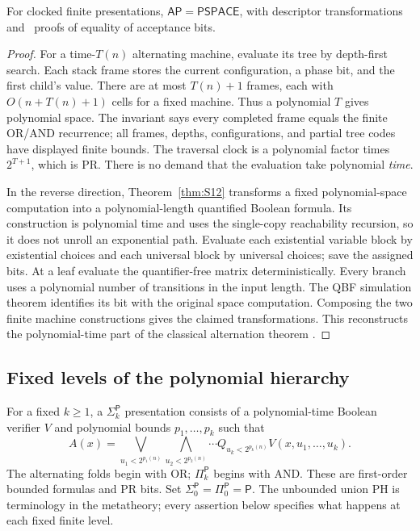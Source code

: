 \begin{theorem}\label{thm:A01}
For clocked finite presentations, $\mathsf{AP}=\mathsf{PSPACE}$, with descriptor transformations and \ipra\ proofs of equality of acceptance bits.
\end{theorem}
\begin{proof}
For a time-$T(n)$ alternating machine, evaluate its tree by depth-first search. Each stack frame stores the current configuration, a phase bit, and the first child's value. There are at most $T(n)+1$ frames, each with $O(n+T(n)+1)$ cells for a fixed machine. Thus a polynomial $T$ gives polynomial space. The invariant says every completed frame equals the finite OR/AND recurrence; all frames, depths, configurations, and partial tree codes have displayed finite bounds. The traversal clock is a polynomial factor times $2^{T+1}$, which is PR. There is no demand that the evaluation take polynomial \emph{time}.

In the reverse direction, Theorem~\ref{thm:S12} transforms a fixed polynomial-space computation into a polynomial-length quantified Boolean formula. Its construction is polynomial time and uses the single-copy reachability recursion, so it does not unroll an exponential path. Evaluate each existential variable block by existential choices and each universal block by universal choices; save the assigned bits. At a leaf evaluate the quantifier-free matrix deterministically. Every branch uses a polynomial number of transitions in the input length. The QBF simulation theorem identifies its bit with the original space computation. Composing the two finite machine constructions gives the claimed transformations. This reconstructs the polynomial-time part of the classical alternation theorem \cite{ChandraKozenStockmeyer1981}.
\end{proof}

\subsection{Fixed levels of the polynomial hierarchy}
For a fixed $k\ge1$, a $\Sigma_k^{\mathsf P}$ presentation consists of a polynomial-time Boolean verifier $V$ and polynomial bounds $p_1,\ldots,p_k$ such that
\[
 A(x)=\bigvee_{u_1<2^{p_1(n)}}
       \bigwedge_{u_2<2^{p_2(n)}}\cdots
       Q_{u_k<2^{p_k(n)}} V(x,u_1,\ldots,u_k).
\]
The alternating folds begin with OR; $\Pi_k^{\mathsf P}$ begins with AND. These are first-order bounded formulas and PR bits. Set $\Sigma_0^{\mathsf P}=\Pi_0^{\mathsf P}=\mathsf P$. The unbounded union PH is terminology in the metatheory; every assertion below specifies what happens at each fixed finite level.

